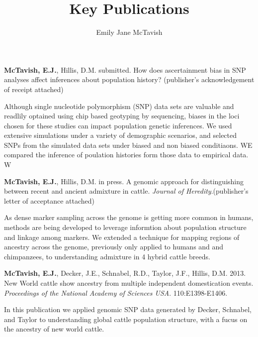 \documentclass[a4paper,10pt]{article}
\title{Key Publications}
\author{Emily Jane McTavish}
\begin{document}
\maketitle

\textbf{McTavish, E.J.}, Hillis, D.M. submitted. How does ascertainment bias in SNP analyses affect inferences about population history? (publisher’s acknowledgement of receipt attached)

Although single nucleotide polymorphism (SNP) data sets are valuable and readlily optained using chip based geotyping by sequencing, biases in the loci chosen for these studies can impact population genetic inferences.
We used extensive simulations under a variety of demographic scenarios, and selected SNPs from the simulated data sets under biased and non biased conditiaons.
WE compared the inference of poulation histories form those data to empirical data. W

\textbf{McTavish, E.J.}, Hillis, D.M. in press. A genomic approach for distinguishing between recent and ancient admixture in cattle.  \textsl{Journal of Heredity}.(publisher’s letter of acceptance attached)

As dense marker sampling across the genome is getting more common in humans, methods are being developed to leverage informtion about population structure and linkage among markers.
We extended a technique for mapping regions of ancestry across the genome, previously only applied to humans and and chimpanzees, to understanding admixture in 4 hybrid cattle breeds.


\textbf{McTavish, E.J.}, Decker, J.E., Schnabel, R.D., Taylor, J.F., Hillis, D.M. 2013. New World cattle show ancestry from multiple independent domestication events.  \textsl{Proceedings of the National Academy of Sciences USA}. 110:E1398-E1406.

In this publication we applied genomic SNP data generated by Decker, Schnabel, and Taylor to understanding global cattle population structure, with a fucus on the ancestry of new world cattle.
\end{document}
